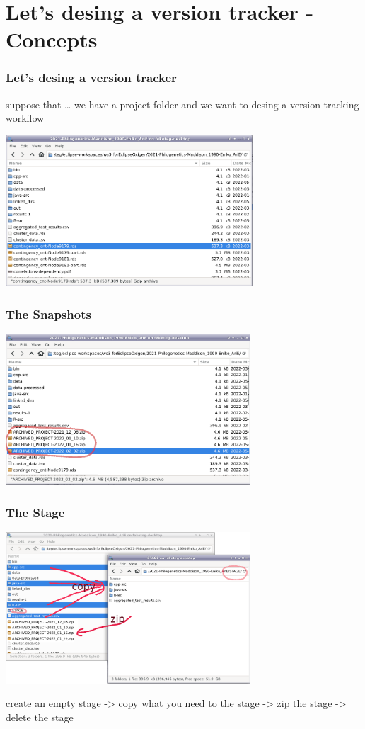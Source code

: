 \documentclass[aspectratio=169]{beamer}
\begin{document}
 
\section{Let's desing a version tracker - Concepts}

\begin{frame}
\frametitle<presentation>{Let's desing a version tracker}
suppose that \dots
  we have a project folder and we want to desing a version tracking workflow

\includegraphics[height=160pt]{pictures/project_folder.png}
\end{frame}

\begin{frame}
\frametitle<presentation>{The Snapshots}
\includegraphics[height=160pt]{pictures/project_folder_with_dated_zips.png}
\end{frame}

\begin{frame}
\frametitle<presentation>{The Stage}
\includegraphics[height=160pt]{pictures/project_folder_stageing.png}

  create an empty stage -> copy what you need to the stage -> zip the stage -> delete the stage
\end{frame}
\end{document}
